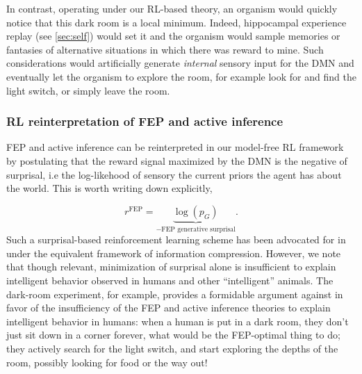 \documentclass[10pt,letterpaper]{article}
\begin{document}
In contrast, operating under our RL-based theory, an organism would quickly notice that this dark room is a local minimum. Indeed, hippocampal experience replay (see \ref{sec:self}) would set it and the organism would sample memories or fantasies of alternative situations in which there was reward to mine. Such considerations would artificially generate \textit{internal} sensory input for the DMN and eventually let the organism to explore the room, for example look for and find the light switch, or simply leave the room. 


\subsubsection{RL reinterpretation of FEP and active inference}  FEP and active inference can be reinterpreted in our model-free RL framework by postulating that the reward signal maximized by the DMN is the negative of surprisal, i.e the log-likehood of sensory the current priors the agent has about the world. This is worth writing down explicitly,

\begin{equation}
  r^{\text{FEP}} = \underbrace{\log (p_G)}_{-\text{FEP generative surprisal}}.
    \end{equation}
    Such a surprisal-based reinforcement learning scheme has been advocated for in \citep{schmidhuber2010,mohamed2015} under the equivalent framework of information compression.
    However, we note that though relevant, minimization of surprisal alone is insufficient to explain intelligent behavior observed in humans and other ``intelligent'' animals. The dark-room experiment, for example, provides a formidable argument against in favor of the insufficiency of the FEP and active inference theories to explain intelligent behavior in humans: when a human is put in a dark room, they don't just sit down in a corner forever, what would be the FEP-optimal thing to do; they actively search for the light switch, and start exploring the depths of the room, possibly looking for food or the way out!
\end{document}
